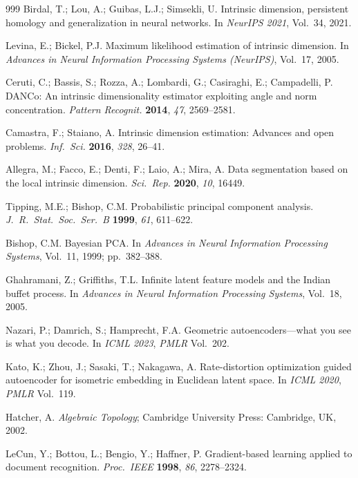 \documentclass[make,article,submit,pdftex,moreauthors]{Definitions/mdpi}
\begin{document}
\begin{thebibliography}{999}
Birdal, T.; Lou, A.; Guibas, L.J.; Simsekli, U.
Intrinsic dimension, persistent homology and generalization in neural
networks.
In \textit{NeurIPS 2021}, Vol.~34, 2021.

Levina, E.; Bickel, P.J.
Maximum likelihood estimation of intrinsic dimension.
In \textit{Advances in Neural Information Processing Systems (NeurIPS)},
Vol.~17, 2005.

Ceruti, C.; Bassis, S.; Rozza, A.; Lombardi, G.; Casiraghi, E.;
Campadelli, P.
DANCo: An intrinsic dimensionality estimator exploiting angle and norm
concentration.
\textit{Pattern Recognit.} \textbf{2014}, \textit{47}, 2569--2581.

Camastra, F.; Staiano, A.
Intrinsic dimension estimation: Advances and open problems.
\textit{Inf.\ Sci.} \textbf{2016}, \textit{328}, 26--41.

Allegra, M.; Facco, E.; Denti, F.; Laio, A.; Mira, A.
Data segmentation based on the local intrinsic dimension.
\textit{Sci.\ Rep.} \textbf{2020}, \textit{10}, 16449.

Tipping, M.E.; Bishop, C.M.
Probabilistic principal component analysis.
\textit{J.\ R.\ Stat.\ Soc.\ Ser.\ B} \textbf{1999}, \textit{61}, 611--622.

Bishop, C.M.
Bayesian PCA.
In \textit{Advances in Neural Information Processing Systems}, Vol.~11,
1999; pp.~382--388.

Ghahramani, Z.; Griffiths, T.L.
Infinite latent feature models and the Indian buffet process.
In \textit{Advances in Neural Information Processing Systems}, Vol.~18,
2005.

Nazari, P.; Damrich, S.; Hamprecht, F.A.
Geometric autoencoders---what you see is what you decode.
In \textit{ICML 2023}, \textit{PMLR} Vol.~202.

Kato, K.; Zhou, J.; Sasaki, T.; Nakagawa, A.
Rate-distortion optimization guided autoencoder for isometric embedding in
Euclidean latent space.
In \textit{ICML 2020}, \textit{PMLR} Vol.~119.

Hatcher, A.
\textit{Algebraic Topology};
Cambridge University Press: Cambridge, UK, 2002.

LeCun, Y.; Bottou, L.; Bengio, Y.; Haffner, P.
Gradient-based learning applied to document recognition.
\textit{Proc.\ IEEE} \textbf{1998}, \textit{86}, 2278--2324.


\end{thebibliography}
\end{document}
